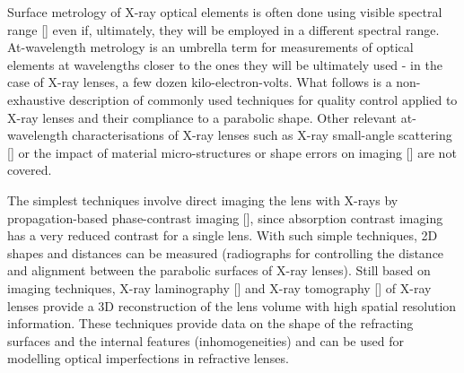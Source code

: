 \begin{refsection}
Surface metrology of X-ray optical elements is often done using visible spectral range [\cite{Alcock2016, Vivo2019}] even if, ultimately, they will be employed in a different spectral range. At-wavelength metrology is an umbrella term for measurements of optical elements at wavelengths closer to the ones they will be ultimately used - in the case of X-ray lenses, a few dozen kilo-electron-volts. What follows is a non-exhaustive description of commonly used techniques for quality control applied to X-ray lenses and their compliance to a parabolic shape. Other relevant at-wavelength characterisations of X-ray lenses such as X-ray small-angle scattering [\cite{Roth2014, Chubar2020}] or the impact of material micro-structures or shape errors on imaging [\cite{Chubar2020,Lyatun2020}] are not covered. 

The simplest techniques involve direct imaging the lens with X-rays by propagation-based phase-contrast imaging [\cite{Endrizzi2018}], since absorption contrast imaging has a very reduced contrast for a single lens. With such simple techniques, 2D shapes and distances can be measured (radiographs for controlling the distance and alignment between the parabolic surfaces of X-ray lenses). Still based on imaging techniques, X-ray laminography [\cite{Helfen2011,Roth2014}] and X-ray tomography [\cite{Landis2010,Narikovich2017}] of X-ray lenses provide a 3D reconstruction of the lens volume with high spatial resolution information. These techniques provide data on the shape of the refracting surfaces and the internal features (inhomogeneities) and can be used for modelling optical imperfections in refractive lenses. 



\end{refsection}
